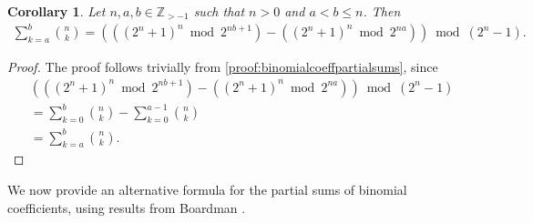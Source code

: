 \documentclass[10pt]{article}
\theoremstyle{plain}
\newtheorem{corollary}{Corollary}[section]
\newcommand{\Z}{\mathbb{Z}}
\begin{document}
\begin{corollary}
Let $n,a,b \in \Z_{>-1}$ such that $n>0$ and $a < b \leq n$. Then
\begin{align*}
\sum_{k=a}^{b} \binom{n}{k}
=
\left(
    \left( (2^n+1)^n \bmod 2^{nb+1} \right)
    - \left( (2^n+1)^n \bmod 2^{na} \right)
\right)
\bmod (2^n-1) .
\end{align*}
\end{corollary}
\begin{proof}
The proof follows trivially from \cref{proof:binomialcoeffpartialsums}, since
\begin{align*}
& \left(
\left( (2^n+1)^n \bmod 2^{nb+1} \right)
- \left( (2^n+1)^n \bmod 2^{na} \right)
\right)
\bmod (2^n-1) \\
&= \sum_{k=0}^{b} \binom{n}{k} - \sum_{k=0}^{a-1} \binom{n}{k} \\
&= \sum_{k=a}^{b} \binom{n}{k} .
\end{align*}
\end{proof}
We now provide an alternative formula for the partial sums of binomial coefficients, using results from Boardman \cite{boardman2004eggdropnumbers}.
\end{document}
